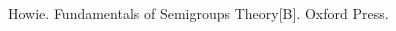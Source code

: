 \pagestyle{fancy}
\fancyhead{} %

\fancyhead[CO]{\leftmark} %
\begin{thebibliography}{99}

 Howie. Fundamentals of Semigroups Theory[B]. Oxford Press.

\end{thebibliography}


